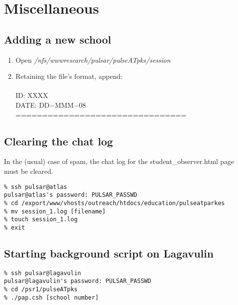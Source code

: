 \documentclass{article}
\begin{document}
\section{Miscellaneous}
\subsection*{Adding a new school}
\begin{enumerate}
\item Open \emph{/nfs/wwwresearch/pulsar/pulseATpks/session}
\item Retaining the file's format, append: \\
\\
ID: XXXX \\
DATE: DD$-$MMM$-$08
================================ \\
\end{enumerate}

\subsection*{Clearing the chat log}
In the (usual) case of spam, the chat log for the student\_observer.html page must be cleared.
\begin{verbatim}
% ssh pulsar@atlas
pulsar@atlas's password: PULSAR_PASSWD
% cd /export/www/vhosts/outreach/htdocs/education/pulseatparkes
% mv session_1.log [filename]
% touch session_1.log
% exit
\end{verbatim}

\subsection*{Starting background script on Lagavulin}
\begin{verbatim}
% ssh pulsar@lagavulin
pulsar@lagavulin's password: PULSAR_PASSWD
% cd /psr1/pulseATpks
% ./pap.csh [school number]
\end{verbatim}
\end{document}
